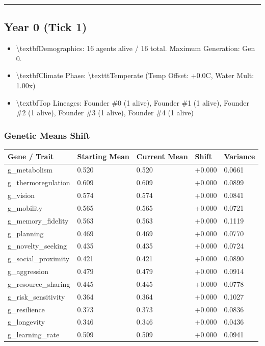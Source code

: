 \documentclass[11pt,a4paper]{article}
\begin{document}
\noindent\rule{\textwidth}{0.4pt}

\subsection*{ Year 0 (Tick 1)}
\begin{itemize}
  \item \textbackslash{}textbf{Demographics:} 16 agents alive / 16 total. Maximum Generation: Gen 0.
  \item \textbackslash{}textbf{Climate Phase:} \textbackslash{}texttt{Temperate} (Temp Offset: +0.0C, Water Mult: 1.00x)
  \item \textbackslash{}textbf{Top Lineages:} Founder \#0 (1 alive), Founder \#1 (1 alive), Founder \#2 (1 alive), Founder \#3 (1 alive), Founder \#4 (1 alive)
\end{itemize}

\subsubsection*{ Genetic Means Shift}
\begin{longtable}{lllll}
\toprule
Gene / Trait & Starting Mean & Current Mean & Shift & Variance \\
\midrule
\endhead
g\_metabolism & 0.520 & 0.520 & +0.000 & 0.0661 \\
g\_thermoregulation & 0.609 & 0.609 & +0.000 & 0.0899 \\
g\_vision & 0.574 & 0.574 & +0.000 & 0.0841 \\
g\_mobility & 0.565 & 0.565 & +0.000 & 0.0721 \\
g\_memory\_fidelity & 0.563 & 0.563 & +0.000 & 0.1119 \\
g\_planning & 0.469 & 0.469 & +0.000 & 0.0770 \\
g\_novelty\_seeking & 0.435 & 0.435 & +0.000 & 0.0724 \\
g\_social\_proximity & 0.421 & 0.421 & +0.000 & 0.0890 \\
g\_aggression & 0.479 & 0.479 & +0.000 & 0.0914 \\
g\_resource\_sharing & 0.445 & 0.445 & +0.000 & 0.0778 \\
g\_risk\_sensitivity & 0.364 & 0.364 & +0.000 & 0.1027 \\
g\_resilience & 0.373 & 0.373 & +0.000 & 0.0836 \\
g\_longevity & 0.346 & 0.346 & +0.000 & 0.0436 \\
g\_learning\_rate & 0.509 & 0.509 & +0.000 & 0.0941 \\
\bottomrule
\end{longtable}
\end{document}
